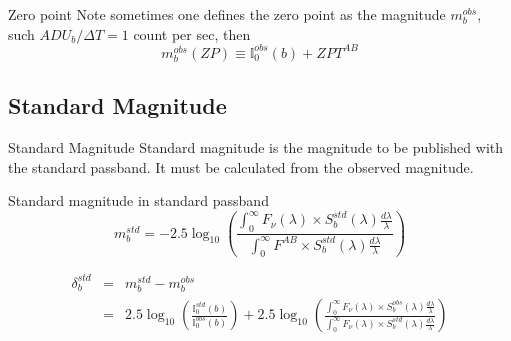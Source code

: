 \documentclass{beamer}
\begin{document}
\begin{frame}{Zero point} 
Note sometimes one defines the zero point as the magnitude $m_b^{obs}$, such $ADU_b/\Delta T = 1$ count per sec, then
\begin{equation}
m^{obs}_b(ZP) \equiv \mathbb{I}_0^{obs}(b) + ZPT^{AB}
\end{equation}	
\end{frame}



\subsection{Standard Magnitude}
\begin{frame}{Standard Magnitude} 
Standard magnitude is the magnitude to be published with the standard passband. 
It must be calculated from the observed magnitude.
\begin{alertblock}{Standard magnitude in standard passband}
	\begin{equation}
	m^{std}_b = -2.5 \log_{10}
	\left( 
	\frac{\int_0^\infty F_\nu(\lambda) \times S_b^{std}(\lambda) \frac{d\lambda}{\lambda} }{\int_0^\infty F^{AB} \times S_b^{std}(\lambda) \frac{d\lambda}{\lambda}} 
	\right)
	\end{equation}	
\end{alertblock}	

\begin{eqnarray}
\delta^{std}_b & = & m_b^{std} - m_b^{obs} \\
& = & 2.5 \log_{10}\left( \frac{\mathbb{I}_0^{std}(b)}{\mathbb{I}_0^{obs}(b)}\right) 
+ 2.5 \log_{10} 
	\left( 
	\frac{\int_0^\infty F_\nu(\lambda) \times S_b^{obs}(\lambda) \frac{d\lambda}{\lambda} }{\int_0^\infty F_\nu(\lambda) \times S_b^{std}(\lambda) \frac{d\lambda}{\lambda}} 
	\right)
\end{eqnarray} 
\end{frame}
\end{document}
